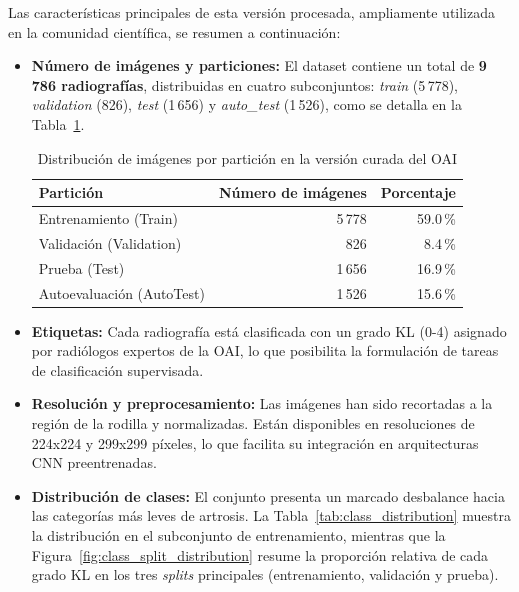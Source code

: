 \documentclass[11pt,spanish,listoffigures,listoftables]{tfgetsinf}
\begin{document}
Las características principales de esta versión procesada, ampliamente
utilizada en la comunidad científica, se resumen a continuación:

\begin{itemize}
	\item \textbf{Número de imágenes y particiones:} El dataset contiene un total de \textbf{9\,786 radiografías}, distribuidas en cuatro subconjuntos: \textit{train} (5\,778), \textit{validation} (826), \textit{test} (1\,656) y \textit{auto\_test} (1\,526), como se detalla en la Tabla~\ref{tab:splits}.

	      \begin{table}[H]
		      \centering
		      \caption{Distribución de imágenes por partición en la versión curada del OAI}
		      \label{tab:splits}
		      \begin{tabular}{lrr}
			      \toprule
			      \textbf{Partición}        & \textbf{Número de imágenes} & \textbf{Porcentaje} \\
			      \midrule
			      Entrenamiento (Train)     & 5\,778                      & 59.0\,\%            \\
			      Validación (Validation)   & 826                         & 8.4\,\%             \\
			      Prueba (Test)             & 1\,656                      & 16.9\,\%            \\
			      Autoevaluación (AutoTest) & 1\,526                      & 15.6\,\%            \\
			      \bottomrule
		      \end{tabular}
	      \end{table}

	\item \textbf{Etiquetas:} Cada radiografía está clasificada con un grado KL (0-4) asignado por radiólogos expertos de la OAI, lo que posibilita la formulación de tareas de clasificación supervisada.

	\item \textbf{Resolución y preprocesamiento:} Las imágenes han sido recortadas a la región de la rodilla y normalizadas. Están disponibles en resoluciones de 224x224 y 299x299 píxeles, lo que facilita su integración en arquitecturas CNN preentrenadas.

	\item \textbf{Distribución de clases:} El conjunto presenta un marcado desbalance hacia las categorías más leves de artrosis. La Tabla~\ref{tab:class_distribution} muestra la distribución en el subconjunto de entrenamiento, mientras que la Figura~\ref{fig:class_split_distribution} resume la proporción relativa de cada grado KL en los tres \textit{splits} principales (entrenamiento, validación y prueba).


\end{itemize}
\end{document}
